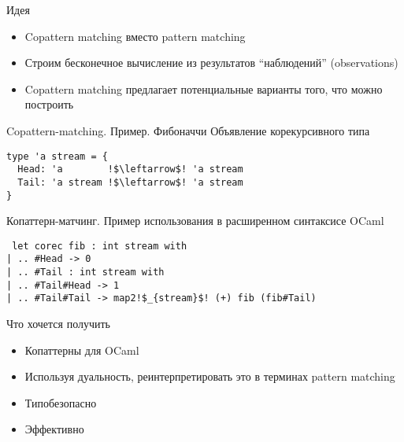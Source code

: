 \documentclass[10pt, mathserif]{beamer}
\theoremstyle{definition}
\begin{document}
\begin{frame}[fragile]{Идея}
\begin{itemize}
 \item Copattern matching вместо pattern matching
 \item Строим бесконечное вычисление из результатов ``наблюдений'' (observations)
 \item Copattern matching предлагает потенциальные варианты того, что можно
      построить
\end{itemize}

\end{frame}


\begin{frame}[fragile]{Copattern-matching. Пример. Фибоначчи}
Объявление корекурсивного типа
\begin{lstlisting}
type 'a stream = {
  Head: 'a        !$\leftarrow$! 'a stream
  Tail: 'a stream !$\leftarrow$! 'a stream
}
\end{lstlisting}

Копаттерн-матчинг. Пример использования в расширенном синтаксисе OCaml
\begin{lstlisting}
 let corec fib : int stream with
| .. #Head -> 0
| .. #Tail : int stream with
| .. #Tail#Head -> 1
| .. #Tail#Tail -> map2!$_{stream}$! (+) fib (fib#Tail)
\end{lstlisting}

\end{frame}

\begin{frame}[fragile]{Что хочется получить}
\begin{itemize}
 \item Копаттерны для OCaml
 \item Используя дуальность, реинтерпретировать это в терминах pattern matching
 \item Типобезопасно
 \item Эффективно
\end{itemize}
\end{frame}
\end{document}
